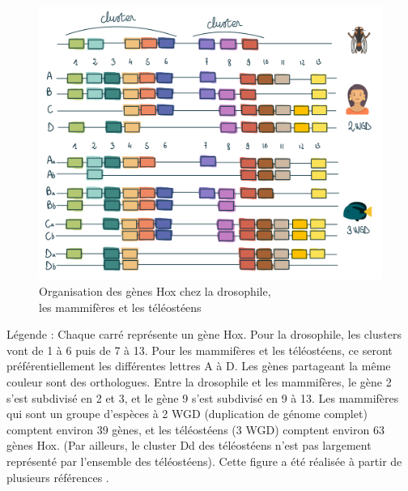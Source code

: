 \begin{figure}[H]
    \centering
    \includegraphics[width=1\textwidth]{figures/corps/figure3.png}
    \caption{Organisation des gènes Hox chez la drosophile,\\ les mammifères et les téléostéens}
    \label{fig:3_hox}
\end{figure}
Légende : Chaque carré représente un gène Hox. Pour la drosophile, les clusters vont de 1 à 6 puis de 7 à 13. Pour les mammifères et les téléostéens, ce seront préférentiellement les différentes lettres A à D. Les gènes partageant la même couleur sont des orthologues. 
Entre la drosophile et les mammifères, le gène 2 s’est subdivisé en 2 et 3, et le gène 9 s’est subdivisé en 9 à 13. Les mammifères qui sont un groupe d’espèces à 2 WGD (duplication de génome complet) comptent environ 39 gènes, et les téléostéens (3 WGD) comptent environ 63 gènes Hox. (Par ailleurs, le cluster Dd des téléostéens n’est pas largement représenté par l’ensemble des téléostéens). Cette figure a été réalisée à partir de plusieurs références \cite{amores_zebrafish_1998, guo_hox_2010, lappin_hox_2006, rux_hox_2017}.



